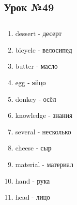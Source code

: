 \subsection{Урок №49}

\subsection*{}
\begin{multicols}{2}
    \begin{enumerate}\setlength{\itemsep}{0pt}
        \item dessert - десерт
        \item bicycle - велосипед
        \item butter - масло
        \item egg - яйцо
        \item donkey - осёл
        \item knowledge - знания
        \item several - несколько
        \item cheese - сыр
        \item material - материал
        \item hand - рука
        \item head - лицо
    \end{enumerate}
\end{multicols}